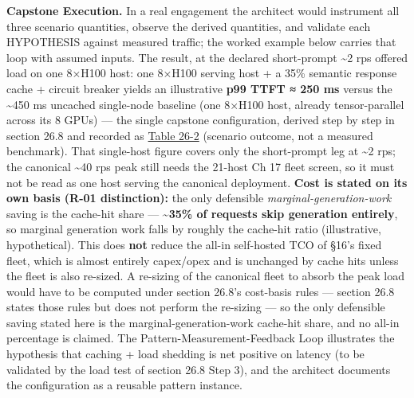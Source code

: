 \textbf{Capstone Execution.} In a real engagement the architect would
instrument all three scenario quantities, observe the derived
quantities, and validate each HYPOTHESIS against measured traffic; the
worked example below carries that loop with assumed inputs. The result,
at the declared short-prompt \textasciitilde2 rps offered load on one
8×H100 host: one 8×H100 serving host + a 35\% semantic response cache +
circuit breaker yields an illustrative \textbf{p99 TTFT ≈ 250 ms} versus
the \textasciitilde450 ms uncached single-node baseline (one 8×H100
host, already tensor-parallel across its 8 GPUs) --- the single capstone
configuration, derived step by step in section 26.8 and recorded as
\hyperref[tab:26.2]{Table 26-2} (scenario outcome, not a measured benchmark). That
single-host figure covers only the short-prompt leg at \textasciitilde2
rps; the canonical \textasciitilde40 rps peak still needs the 21-host Ch
17 fleet screen, so it must not be read as one host serving the
canonical deployment. \textbf{Cost is stated on its own basis (R-01
distinction):} the only defensible \emph{marginal-generation-work}
saving is the cache-hit share --- \textbf{\textasciitilde35\% of
requests skip generation entirely}, so marginal generation work falls by
roughly the cache-hit ratio (illustrative, hypothetical). This does
\textbf{not} reduce the all-in self-hosted TCO of §16's fixed fleet,
which is almost entirely capex/opex and is unchanged by cache hits
unless the fleet is also re-sized. A re-sizing of the canonical fleet to
absorb the peak load would have to be computed under section 26.8's
cost-basis rules --- section 26.8 states those rules but does not
perform the re-sizing --- so the only defensible saving stated here is
the marginal-generation-work cache-hit share, and no all-in percentage
is claimed. The Pattern-Measurement-Feedback Loop illustrates the
hypothesis that caching + load shedding is net positive on latency (to
be validated by the load test of section 26.8 Step 3), and the architect
documents the configuration as a reusable pattern instance.


